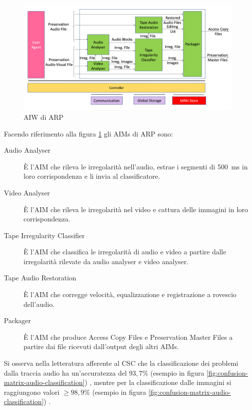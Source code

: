 \begin{figure}[H]
    \centering
    \includegraphics[width=\textwidth]{img/arp-workflow.png}
    \caption{\ac{AIW} di \acl{ARP}}
    \label{fig:arp-workflow}
\end{figure}

Facendo riferimento alla figura \ref{fig:arp-workflow} gli \acp{AIM} di \ac{ARP} sono:
\begin{description}
    \item[Audio Analyser] È l'\ac{AIM} che rileva le irregolarità nell'audio, estrae i segmenti di \qty{500}{\ms} in loro corrispondenza e li invia al classificatore.
    \item[Video Analyser] È l'\ac{AIM} che rileva le irregolarità nel video e cattura delle immagini in loro corrispondenza.
    \item[Tape Irregularity Classifier] È l'\ac{AIM} che classifica le irregolarità di audio e video a partire dalle irregolarità rilevate da audio analyser e video analyser.   %
    \item[Tape Audio Restoration] È l'\ac{AIM} che corregge velocità, equalizzazione e registrazione a rovescio dell'audio.
    \item[Packager] È l'\ac{AIM} che produce Access Copy Files e Preservation Master Files a partire dai file ricevuti dall'output degli altri \acp{AIM}.
\end{description}

Si osserva nella letteratura afferente al \ac{CSC} che la classificazione dei problemi dalla traccia audio ha un'accuratezza del $93,7\%$ (esempio in figura \ref{fig:confusion-matrix-audio-classification}) \cite[min. 35:10]{mpaistandardsMPAIPresentsContextbased2023}, mentre per la classificazione dalle immagini si raggiungono valori $\geq 98,9\%$ (esempio in figura \ref{fig:confusion-matrix-audio-classification}) \cite[fig. 3 e p. 70]{prettoComputingMethodologiesSupporting2018}.

